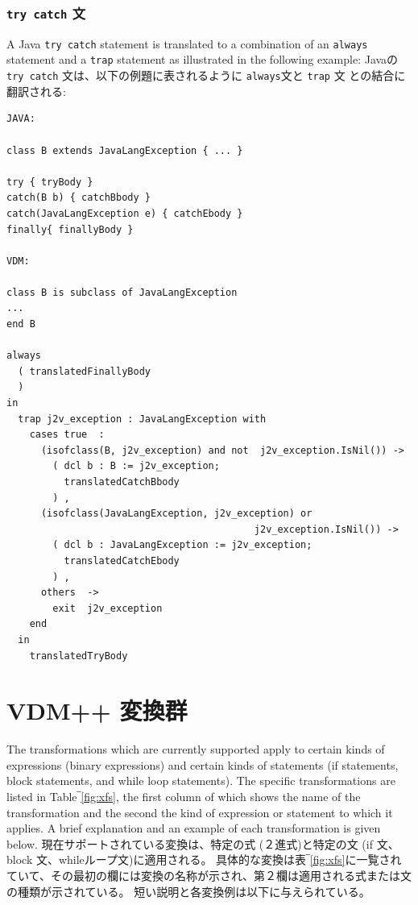 \documentclass[\pformat,12pt]{jarticle}
\begin{document}
\subsubsection{\texttt{try catch} 文}

A Java \texttt{try catch} statement is translated to a combination of
an \texttt{always} statement and a \texttt{trap} statement as
illustrated in the following example:
Javaの \texttt{try catch} 文は、以下の例題に表されるように \texttt{always}文と \texttt{trap} 文 との結合に翻訳される:

\begin{small}
\begin{verbatim}
JAVA:

class B extends JavaLangException { ... }

try { tryBody }
catch(B b) { catchBbody }
catch(JavaLangException e) { catchEbody }
finally{ finallyBody }

VDM:

class B is subclass of JavaLangException
...
end B

always  
  ( translatedFinallyBody 
  ) 
in  
  trap j2v_exception : JavaLangException with  
    cases true  : 
      (isofclass(B, j2v_exception) and not  j2v_exception.IsNil()) -> 
        ( dcl b : B := j2v_exception;
          translatedCatchBbody 
        ) ,
      (isofclass(JavaLangException, j2v_exception) or 
                                           j2v_exception.IsNil()) -> 
        ( dcl b : JavaLangException := j2v_exception;
          translatedCatchEbody 
        ) ,
      others  -> 
        exit  j2v_exception
    end  
  in  
    translatedTryBody
\end{verbatim}
\end{small}

\newpage
\section{VDM++ 変換群}
\label{xforms}

The transformations which are currently supported apply to certain
kinds of expressions (binary expressions) and certain kinds of
statements (if statements, block statements, and while loop
statements). The specific transformations are listed in
Table‾\ref{fig:xfs}, the first column of which shows the 
name of the transformation and the second the kind of expression or
statement to which it applies. A brief explanation and an example of
each transformation is given below.
現在サポートされている変換は、特定の式 (２進式)と特定の文 (if 文、block 文、whileループ文)に適用される。 
具体的な変換は表‾\ref{fig:xfs}に一覧されていて、その最初の欄には変換の名称が示され、第２欄は適用される式または文の種類が示されている。
短い説明と各変換例は以下に与えられている。
\end{document}
